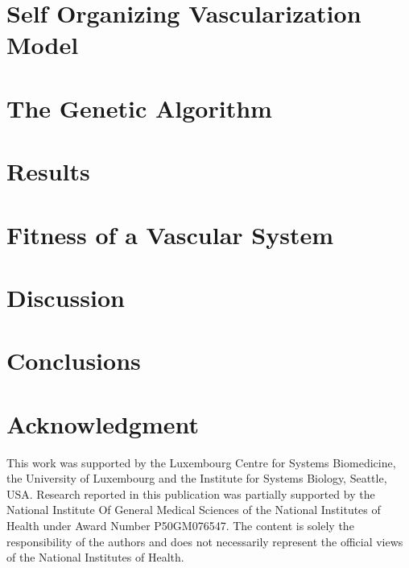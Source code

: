 \documentclass[conference, 12pt]{IEEEtran}
\begin{document}


\section{Self Organizing Vascularization Model}



\section{The Genetic Algorithm}



\section{Results}



\section{Fitness of a Vascular System}
\label{fitnessFunction}



\section{Discussion}


\section{Conclusions}


\section*{Acknowledgment}

This work was supported by the Luxembourg Centre for Systems Biomedicine, the University of Luxembourg and the Institute for Systems Biology, Seattle, USA. Research reported in this publication was partially supported by the National Institute Of General Medical Sciences of the National Institutes of Health under Award Number P50GM076547. The content is solely the responsibility of the authors and does not necessarily represent the official views of the National Institutes of Health.



\begin{small}


\end{small}
\end{document}
